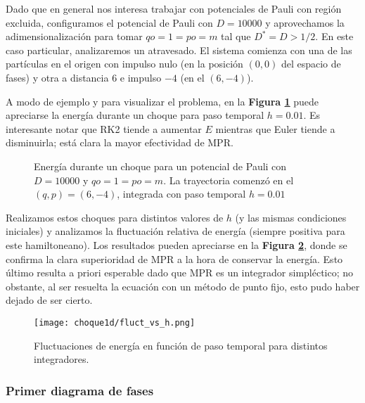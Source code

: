 Dado que en general nos interesa trabajar con potenciales de Pauli con región excluida, configuramos el potencial de Pauli con $D = 10000$ y aprovechamos la adimensionalización para tomar $qo = 1 = po = m$ tal que $D^*=D>1/2$.
En este caso particular, analizaremos un atravesado.
El sistema comienza con una de las partículas en el origen con impulso nulo (en la posición $(0, 0)$ del espacio de fases) y otra a distancia $6$ e impulso $-4$ (en el $(6, -4)$).

A modo de ejemplo y para visualizar el problema, en la \textbf{Figura \ref{fig:energ_choq}} puede apreciarse la energía durante un choque para paso temporal $h=0.01$.
Es interesante notar que RK2 tiende a aumentar $E$ mientras que Euler tiende a disminuirla; está clara la mayor efectividad de MPR.

\begin{figure}[h]
	\centering
	\caption{Energía durante un choque para un potencial de Pauli con $D = 10000$ y $qo = 1 = po = m$. La trayectoria comenzó en el $(q, p) = (6, -4)$, integrada con paso temporal $h=0.01$}
	\label{fig:energ_choq}
\end{figure}

Realizamos estos choques para distintos valores de $h$ (y las mismas condiciones iniciales) y analizamos la fluctuación relativa de energía (siempre positiva para este hamiltoneano).
Los resultados pueden apreciarse en la \textbf{Figura \ref{fig:flucvsh}}, donde se confirma la clara superioridad de MPR a la hora de conservar la energía.
Esto último resulta a priori esperable dado que MPR es un integrador simpléctico; no obstante, al ser resuelta la ecuación con un método de punto fijo, esto pudo haber dejado de ser cierto.

\begin{figure}[h]
	\centering
	\texttt{[image: choque1d/fluct\_vs\_h.png]}
	\caption{Fluctuaciones de energía en función de paso temporal para distintos integradores.}
	\label{fig:flucvsh}
\end{figure}

\subsubsection{Primer diagrama de fases}

